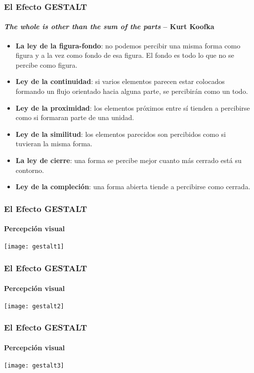\documentclass[14pt]{beamer}
\begin{document}
\begin{frame}
\frametitle{El Efecto GESTALT}
\framesubtitle{\emph{The whole is other than the sum of the parts} -- \tiny{Kurt Koofka}}
\scriptsize{
\begin{itemize}
\item \textbf{La ley de la figura-fondo}: no podemos percibir una misma forma como figura y a la vez como fondo de esa figura. El fondo es todo lo que no se percibe como figura.\\
\item \textbf{Ley de la continuidad}: si varios elementos parecen estar colocados formando un flujo orientado hacia alguna parte, se percibirán como un todo.\\
\item \textbf{Ley de la proximidad}: los elementos próximos entre sí tienden a percibirse como si formaran parte de una unidad.\\
\item \textbf{Ley de la similitud}: los elementos parecidos son percibidos como si tuvieran la misma forma.\\
\item \textbf{La ley de cierre}: una forma se percibe mejor cuanto más cerrado está su contorno.\\
\item \textbf{Ley de la compleción}: una forma abierta tiende a percibirse como cerrada.
\end{itemize}
}
\end{frame}
\begin{frame}
\frametitle{El Efecto GESTALT}
\framesubtitle{Percepción visual}
\begin{center}
\texttt{[image: gestalt1]}
\end{center}
\end{frame}
\begin{frame}
\frametitle{El Efecto GESTALT}
\framesubtitle{Percepción visual}
\begin{center}
\texttt{[image: gestalt2]}
\end{center}
\end{frame}
\begin{frame}
\frametitle{El Efecto GESTALT}
\framesubtitle{Percepción visual}
\begin{center}
\texttt{[image: gestalt3]}
\end{center}
\end{frame}
\end{document}
